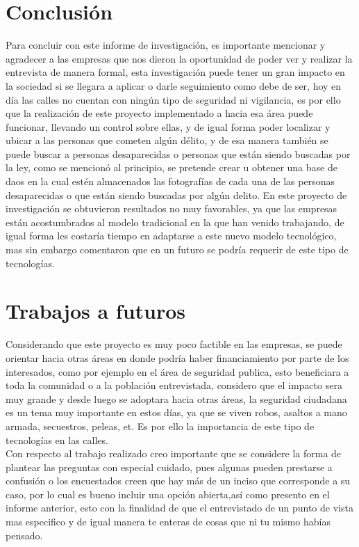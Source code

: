 \documentclass{comjnl}
\begin{document}
\newpage
\section{Conclusión }
Para concluir con este informe de investigación, es importante mencionar y agradecer a las empresas que nos dieron la oportunidad de poder ver y realizar la entrevista de manera formal, esta investigación puede tener un gran impacto en la sociedad si se llegara a aplicar o darle seguimiento como debe de ser, hoy en día las calles no cuentan con ningún tipo de seguridad ni vigilancia, es por ello que la realización de este proyecto implementado a hacia esa área puede funcionar, llevando un control sobre ellas, y de igual forma poder localizar y ubicar a las personas que cometen algún délito, y de esa manera también se puede buscar a personas desaparecidas o personas que están siendo buscadas por la ley, como se mencionó al principio, se pretende crear u obtener una base de daos en la cual estén almacenados las fotografías de cada una de las personas desaparecidas o que están siendo buscadas por algún delito.
En este proyecto de investigación se obtuvieron resultados no muy favorables, ya que las empresas están acostumbrados al modelo tradicional en la que han venido trabajando, de igual forma les costaría tiempo en adaptarse a este nuevo modelo tecnológico, mas sin embargo comentaron que en un futuro se podría requerir de este tipo de tecnologías.
\section{Trabajos a futuros} \label{Trabajos a futuros}
Considerando que este proyecto es muy poco factible en las empresas, se puede orientar hacia otras áreas en donde podría haber financiamiento por parte de los interesados, como por ejemplo en el área de seguridad publica, esto beneficiara a toda la comunidad o a la población entrevistada, considero que el impacto sera muy grande y desde luego se adoptara hacia otras áreas, la seguridad ciudadana es un tema muy importante en estos días, ya que se viven robos, asaltos a mano armada, secuestros, peleas, et. Es por ello la importancia de este tipo de tecnologías en las calles.\\
Con respecto al trabajo realizado creo importante que se considere la forma de plantear las preguntas con especial cuidado, pues algunas pueden prestarse a confusión o los encuestados creen que hay más de un inciso que corresponde a su caso, por lo cual es bueno incluir una opción abierta,así como presento en el informe anterior, esto con la finalidad de que el entrevistado de un punto de vista mas especifico y de igual manera te enteras de cosas que ni tu mismo habías pensado.
\nocite{*}
\end{document}
